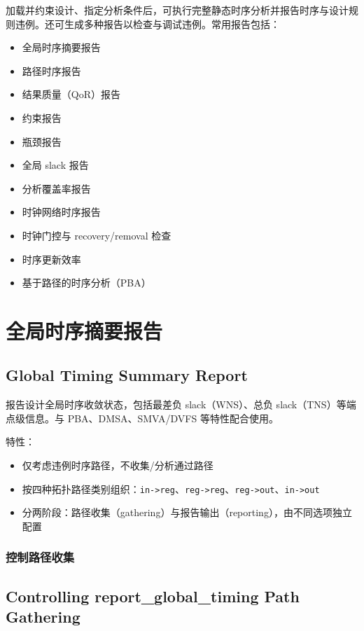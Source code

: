 \label{chap:report}

加载并约束设计、指定分析条件后，可执行完整静态时序分析并报告时序与设计规则违例。还可生成多种报告以检查与调试违例。常用报告包括：
\begin{itemize}
  \item 全局时序摘要报告
  \item 路径时序报告
  \item 结果质量（QoR）报告
  \item 约束报告
  \item 瓶颈报告
  \item 全局 slack 报告
  \item 分析覆盖率报告
  \item 时钟网络时序报告
  \item 时钟门控与 recovery/removal 检查
  \item 时序更新效率
  \item 基于路径的时序分析（PBA）
\end{itemize}

\section{全局时序摘要报告}
\subsection*{Global Timing Summary Report}

 报告设计全局时序收敛状态，包括最差负 slack（WNS）、总负 slack（TNS）等端点级信息。与 PBA、DMSA、SMVA/DVFS 等特性配合使用。

特性：
\begin{itemize}
  \item 仅考虑违例时序路径，不收集/分析通过路径
  \item 按四种拓扑路径类别组织：\texttt{in->reg}、\texttt{reg->reg}、\texttt{reg->out}、\texttt{in->out}
  \item 分两阶段：路径收集（gathering）与报告输出（reporting），由不同选项独立配置
\end{itemize}

\subsubsection{控制路径收集}
\subsection*{Controlling report\_global\_timing Path Gathering}

